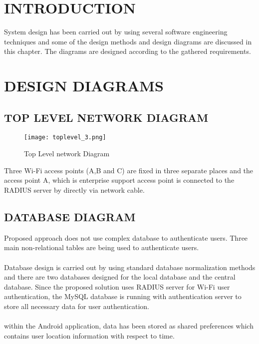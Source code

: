 \section{INTRODUCTION}
System design has been carried out by using several software engineering techniques and some of the design methods and design diagrams are discussed in this chapter. The diagrams are designed according to the gathered requirements.

\section{DESIGN DIAGRAMS}
\subsection{TOP LEVEL NETWORK DIAGRAM}
\begin{figure}[H]	
	\centering
	\texttt{[image: toplevel\_3.png]}
	\caption{Top Level network Diagram}
\end{figure}

Three Wi-Fi access points (A,B and C) are fixed in three separate places and the access point A, which is enterprise support access point is connected to the RADIUS server by directly via network cable. 


\subsection{DATABASE DIAGRAM}
Proposed approach does not use complex database to authenticate users. Three main non-relational tables are being used to authenticate users.

\paragraph{}
Database design is carried out by using standard database normalization methods and there are two databases designed for the local database and the central database. Since the proposed solution uses RADIUS server for Wi-Fi user authentication, the MySQL database is running with authentication server to store all necessary data for user authentication.

\paragraph{}
within the Android application, data has been stored as shared preferences which contains user location information with respect to time.

